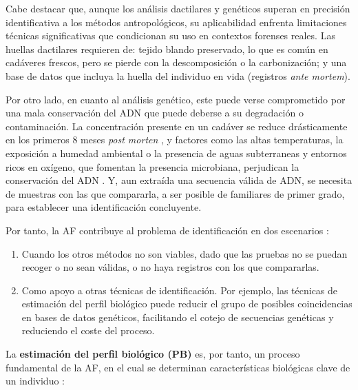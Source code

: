 Cabe destacar que, aunque los análisis dactilares y genéticos superan en precisión identificativa a los 
métodos antropológicos, su aplicabilidad enfrenta limitaciones técnicas significativas que condicionan 
su uso en contextos forenses reales.
Las huellas dactilares requieren de: tejido blando preservado, lo que es común en cadáveres frescos, 
pero se pierde con la descomposición o la carbonización; y una base de datos que incluya la huella del 
individuo en vida (registros \textit{ante mortem}).

Por otro lado, en cuanto al análisis genético, este puede verse comprometido por una mala conservación del 
ADN que puede deberse a su degradación o contaminación. La concentración presente en un cadáver se reduce 
drásticamente en los primeros 8 meses \textit{post morten} \cite{higgins2015}, y factores como las 
altas temperaturas, la exposición a humedad ambiental o la presencia de aguas subterraneas y entornos 
ricos en oxígeno, que fomentan la presencia microbiana, perjudican la conservación del ADN \cite{latham2018}. 
Y, aun extraída una secuencia válida de ADN, se necesita de muestras con las que compararla, a ser posible de 
familiares de primer grado, para establecer una identificación concluyente. 

Por tanto, la AF contribuye al problema de identificación en dos escenarios \cite{swganth2010}:  

\begin{enumerate}

    \item Cuando los otros métodos no son viables, dado que las pruebas no se puedan recoger o no sean válidas, o 
    no haya registros con los que compararlas.
    \item Como apoyo a otras técnicas de identificación. Por ejemplo, las técnicas de estimación del perfil 
    biológico puede reducir el grupo de posibles coincidencias en bases de datos genéticos, facilitando el 
    cotejo de secuencias genéticas y reduciendo el coste del proceso.  

\end{enumerate}

La \textbf{estimación del perfil biológico (PB)} es, por tanto, un proceso fundamental de la AF, en el cual
se determinan características biológicas clave de un individuo \cite{byers2023}: 

